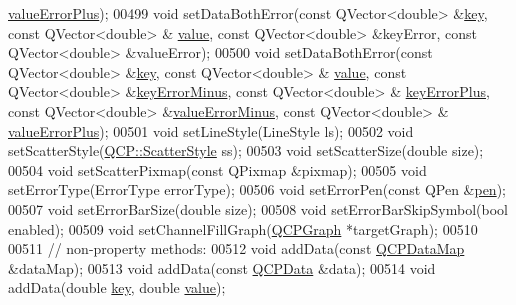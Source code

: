 \begin{DoxyCode}
      \hyperlink{a00116_a6d93a38079a2b52118982e82673e87a3}{valueErrorPlus});
00499   \textcolor{keywordtype}{void} setDataBothError(\textcolor{keyword}{const} QVector<double> &\hyperlink{a00116_a94bb892c30911cd62cba0707a5395be4}{key}, \textcolor{keyword}{const} QVector<double> &
      \hyperlink{a00116_aee90379adb0307effb138f4871edbc5c}{value}, \textcolor{keyword}{const} QVector<double> &keyError, \textcolor{keyword}{const} QVector<double> &valueError);
00500   \textcolor{keywordtype}{void} setDataBothError(\textcolor{keyword}{const} QVector<double> &\hyperlink{a00116_a94bb892c30911cd62cba0707a5395be4}{key}, \textcolor{keyword}{const} QVector<double> &
      \hyperlink{a00116_aee90379adb0307effb138f4871edbc5c}{value}, \textcolor{keyword}{const} QVector<double> &\hyperlink{a00116_a7d90a6258f6d24ad254245076e5beac7}{keyErrorMinus}, \textcolor{keyword}{const} QVector<double> &
      \hyperlink{a00116_a1d47938cd7209297ef861cf01816d89f}{keyErrorPlus}, \textcolor{keyword}{const} QVector<double> &\hyperlink{a00116_aea31bce613e569fc5e1888465c677909}{valueErrorMinus}, \textcolor{keyword}{const} QVector<double> &
      \hyperlink{a00116_a6d93a38079a2b52118982e82673e87a3}{valueErrorPlus});
00501   \textcolor{keywordtype}{void} setLineStyle(LineStyle ls);
00502   \textcolor{keywordtype}{void} setScatterStyle(\hyperlink{a00143_af66d0711d42fe78d96c28abadc67f26f}{QCP::ScatterStyle} ss);
00503   \textcolor{keywordtype}{void} setScatterSize(\textcolor{keywordtype}{double} size);
00504   \textcolor{keywordtype}{void} setScatterPixmap(\textcolor{keyword}{const} QPixmap &pixmap);
00505   \textcolor{keywordtype}{void} setErrorType(ErrorType errorType);
00506   \textcolor{keywordtype}{void} setErrorPen(\textcolor{keyword}{const} QPen &\hyperlink{a00116_a1f13fffa0a0faac34ec342973e613a4a}{pen});
00507   \textcolor{keywordtype}{void} setErrorBarSize(\textcolor{keywordtype}{double} size);
00508   \textcolor{keywordtype}{void} setErrorBarSkipSymbol(\textcolor{keywordtype}{bool} enabled);
00509   \textcolor{keywordtype}{void} setChannelFillGraph(\hyperlink{a00031}{QCPGraph} *targetGraph);
00510   
00511   \textcolor{comment}{// non-property methods:}
00512   \textcolor{keywordtype}{void} addData(\textcolor{keyword}{const} \hyperlink{a00116_a84a9c4a4c2216ccfdcb5f3067cda76e3}{QCPDataMap} &dataMap);
00513   \textcolor{keywordtype}{void} addData(\textcolor{keyword}{const} \hyperlink{a00030_d2/d94/a00184}{QCPData} &data);
00514   \textcolor{keywordtype}{void} addData(\textcolor{keywordtype}{double} \hyperlink{a00116_a94bb892c30911cd62cba0707a5395be4}{key}, \textcolor{keywordtype}{double} \hyperlink{a00116_aee90379adb0307effb138f4871edbc5c}{value});

\end{DoxyCode}
